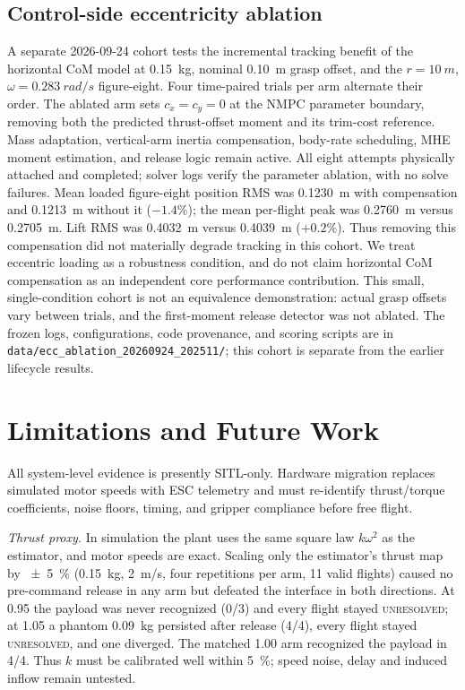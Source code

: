 \documentclass[conference]{IEEEtran}
\begin{document}



\subsection{Control-side eccentricity ablation}\label{sec:eccablation}
A separate 2026-09-24 cohort tests the incremental tracking benefit of the
horizontal CoM model at \SI{0.15}{kg}, nominal \SI{0.10}{m} grasp offset,
and the $r=\SI{10}{m}$, $\omega=\SI{0.283}{rad/s}$ figure-eight.
Four time-paired trials per arm alternate their order. The ablated arm sets
$c_x=c_y=0$ at the NMPC parameter boundary, removing both the predicted
thrust-offset moment and its trim-cost reference. Mass adaptation, vertical-arm
inertia compensation, body-rate scheduling, MHE moment estimation, and release
logic remain active. All eight attempts physically attached and completed;
solver logs verify the parameter ablation, with no solve failures.
Mean loaded figure-eight position RMS was \SI{0.1230}{m} with compensation
and \SI{0.1213}{m} without it ($-1.4\%$); the mean per-flight peak was
\SI{0.2760}{m} versus \SI{0.2705}{m}. Lift RMS was \SI{0.4032}{m}
versus \SI{0.4039}{m} ($+0.2\%$). Thus removing this compensation did not
materially degrade tracking in this cohort. We treat eccentric loading as a
robustness condition, and do not claim horizontal CoM compensation as an
independent core performance contribution. This small, single-condition cohort
is not an equivalence demonstration: actual grasp offsets vary between trials,
and the first-moment release detector was not ablated. The frozen logs,
configurations, code provenance, and scoring scripts are in
\texttt{data/ecc\_ablation\_20260924\_202511/}; this cohort is separate from
the earlier lifecycle results.

\section{Limitations and Future Work}\label{sec:limits}
All system-level evidence is presently SITL-only. Hardware migration replaces simulated motor
speeds with ESC telemetry and must re-identify thrust/torque coefficients, noise floors, timing,
and gripper compliance before free flight.

\emph{Thrust proxy.} In simulation the plant uses the same square law $k\omega^2$ as the
estimator, and motor speeds are exact. Scaling only the estimator's thrust map by
\SI{\pm5}{\percent} (\SI{0.15}{kg}, \SI{2}{m/s}, four repetitions per arm, 11 valid flights)
caused no pre-command release in any arm but defeated the interface in both directions. At 0.95
the payload was never recognized (0/3) and every flight stayed \textsc{unresolved}; at 1.05 a
phantom \SI{+0.09}{kg} persisted after release (4/4), every flight stayed \textsc{unresolved},
and one diverged. The matched 1.00 arm recognized the payload in 4/4. Thus $k$
must be calibrated well within \SI{5}{\percent}; speed noise, delay and induced inflow
\cite{bangura2012} remain untested.
\end{document}
